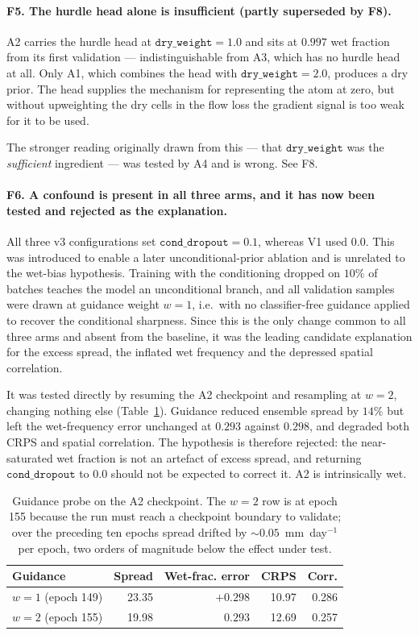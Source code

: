 \paragraph{F5. The hurdle head alone is insufficient (partly superseded by F8).} A2 carries the hurdle head at $\texttt{dry\_weight}=1.0$ and sits at
$0.997$ wet fraction from its first validation --- indistinguishable from A3,
which has no hurdle head at all. Only A1, which combines the head with
$\texttt{dry\_weight}=2.0$, produces a dry prior. The head supplies the
mechanism for representing the atom at zero, but without upweighting the dry
cells in the flow loss the gradient signal is too weak for it to be used.

The stronger reading originally drawn from this --- that $\texttt{dry\_weight}$
was the \emph{sufficient} ingredient --- was tested by A4 and is wrong. See F8.

\paragraph{F6. A confound is present in all three arms, and it has now been
tested and rejected as the explanation.} All three v3 configurations set
$\texttt{cond\_dropout}=0.1$, whereas V1 used $0.0$. This was introduced to
enable a later unconditional-prior ablation and is unrelated to the wet-bias
hypothesis. Training with the conditioning dropped on $10\%$ of batches teaches
the model an unconditional branch, and all validation samples were drawn at
guidance weight $w=1$, i.e.\ with no classifier-free guidance applied to recover
the conditional sharpness. Since this is the only change common to all three
arms and absent from the baseline, it was the leading candidate explanation for
the excess spread, the inflated wet frequency and the depressed spatial
correlation.

It was tested directly by resuming the A2 checkpoint and resampling at $w=2$,
changing nothing else (Table~\ref{tab:cfg-probe}). Guidance reduced ensemble
spread by $14\%$ but left the wet-frequency error unchanged at $0.293$ against
$0.298$, and degraded both CRPS and spatial correlation. The hypothesis is
therefore rejected: the near-saturated wet fraction is not an artefact of
excess spread, and returning $\texttt{cond\_dropout}$ to $0.0$ should not be
expected to correct it. A2 is intrinsically wet.

\begin{table}[htbp]
\centering
\caption{Guidance probe on the A2 checkpoint. The $w=2$ row is at epoch 155
because the run must reach a checkpoint boundary to validate; over the preceding
ten epochs spread drifted by ${\sim}0.05$~mm~day$^{-1}$ per epoch, two orders of
magnitude below the effect under test.}
\label{tab:cfg-probe}
\begin{tabular}{lrrrr}
\hline
Guidance & Spread & Wet-frac. error & CRPS & Corr. \\
\hline
$w=1$ (epoch 149) & 23.35 & $+0.298$ & 10.97 & 0.286 \\
$w=2$ (epoch 155) & 19.98 & $\phantom{+}0.293$ & 12.69 & 0.257 \\
\hline
\end{tabular}
\end{table}

